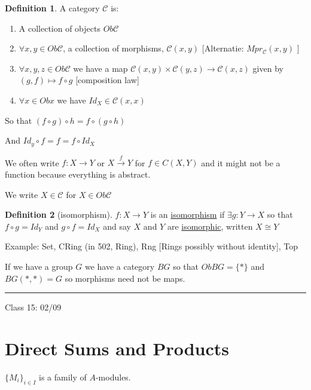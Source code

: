 \documentclass{article}
\theoremstyle{definition}
\newtheorem{definition}{Definition}
\begin{document}
\begin{definition}
    A category \(\mathcal{C}\) is:

    \begin{enumerate}
        \item A collection of objects \(Ob \mathcal{C}\) 
        \item \(\forall x,y\in Ob \mathcal{C}\), a collection of morphisms, \(\mathcal{C}(x,y)\) [Alternatie: \(Mpr_{\mathcal{C}} (x,y)\) ]
        \item \(\forall x,y,z\in Ob \mathcal{C}\) we have a map \(\mathcal{C} (x,y) \times \mathcal{C}(y,z) \to \mathcal{C} (x,z)\) given by \((g,f) \mapsto f\circ g\) [composition law]
        \item \(\forall x\in Ob x\) we have \(Id_X \in \mathcal{C}(x,x)\)
    \end{enumerate}

    So that \((f\circ g)\circ h = f \circ (g\circ h)\) 

    And \(Id_y \circ f = f = f\circ Id_X\) 

\end{definition}

We often write \(f : X \to Y\) or \(X \overset{f}{\to } Y\) for \(f\in C(X,Y)\) and it might not be a function because everything is abstract.

We write \(X\in \mathcal{C}\) for \(X\in Ob \mathcal{C}\) 

\begin{definition}
    [isomorphism]

    \(f: X \to Y\) is an \underline{isomorphism} if \(\exists g: Y \to X\) so that \(f\circ g = Id_Y\) and \(g\circ f = Id_X\) and say \(X\) and \(Y\) are \underline{isomorphic}, written \(X\cong Y\) 
\end{definition}

Example: Set, CRing (in 502, Ring), Rng [Rings possibly without identity], Top

If we have a group \(G\) we have a category \(BG\) so that \(Ob BG = \{ * \} \) and \(BG(*,*) = G\) so morphisms need not be maps.

\hfil
\hrule

Class 15: 02/09

\section*{Direct Sums and Products}

\(\{ M_i \}_{i\in I}\) is a family of \(A\)-modules.
\end{document}
